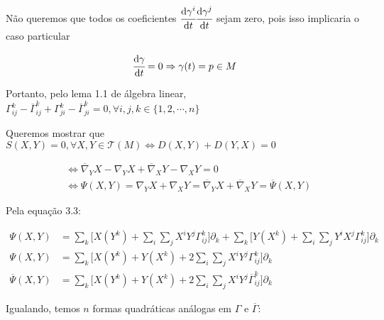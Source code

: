 \documentclass[10pt,a4paper]{article}
\begin{document}
		N\~ao queremos que todos os coeficientes $\cfrac{\mathrm{d} \gamma^i}{\mathrm{d} t} \cfrac{\mathrm{d} \gamma^j}{\mathrm{d} t}$ sejam zero, pois isso implicaria o caso particular

		\begin{align*}
		\cfrac{\mathrm{d} \gamma}{\mathrm{d} t} = 0 \Rightarrow \gamma(t) = p \in M
		\end{align*}

		\vspace{6mm}

		Portanto, pelo lema 1.1 de \'algebra linear,	$\Gamma_{ij}^k - \overline{\Gamma}_{ij}^k + \Gamma_{ji}^k - \overline{\Gamma}_{ji}^k = 0, \forall i,j,k \in \{ 1, 2, \cdots, n \}$

		\vspace{3mm}

		Queremos mostrar que $S(X, Y) = 0, \forall X, Y \in \mathcal{T}(M) \Leftrightarrow D(X, Y) + D(Y, X) = 0$

		\begin{align}
		&\Leftrightarrow  \overline{\nabla}_Y X - \nabla_Y X + \overline{\nabla}_X Y - \nabla_X Y = 0 \label{first} \\
		&\Leftrightarrow \Psi(X,Y) = \nabla_Y X + \nabla_X Y = \overline{\nabla}_Y X + \overline{\nabla}_X Y = \overline{\Psi}(X, Y) \label{second}
		\end{align}

		Pela equa\c{c}\~ao 3.3:

		\begin{align*}
  		\Psi(X, Y) &= \sum_k \bigg[ X(Y^k) + \sum_i \sum_j X^i Y^j \Gamma_{ij}^k \bigg] \partial_k + \sum_k \bigg[ Y(X^k) + \sum_i \sum_j Y^i X^j \Gamma_{ij}^k \bigg] \partial_k \\
  		\Psi(X, Y) &= \sum_k \bigg[ X(Y^k) + Y(X^k) + 2 \sum_i \sum_j X^i Y^j \Gamma_{ij}^k \bigg] \partial_k \\
  		\overline{\Psi}(X, Y) &= \sum_k \bigg[ X(Y^k) + Y(X^k) + 2 \sum_i \sum_j X^i Y^j \overline{\Gamma}_{ij}^k \bigg] \partial_k
		\end{align*}

		Igualando, temos $n$ formas quadr\'aticas an\'alogas em $\Gamma$ e $\overline{\Gamma}$:
\end{document}
